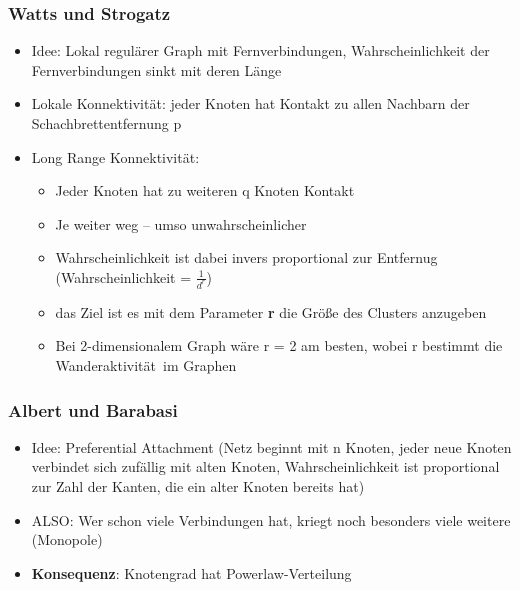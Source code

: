 \documentclass{article} %
\begin{document}
	\subsubsection{Watts und Strogatz}
	\begin{itemize}
		\item Idee: Lokal regulärer Graph mit Fernverbindungen, Wahrscheinlichkeit der Fernverbindungen sinkt mit deren Länge 
		\item Lokale Konnektivität: jeder Knoten hat Kontakt zu allen Nachbarn der Schachbrettentfernung p
		\item Long Range Konnektivität: 
		\begin{itemize}
			\item Jeder Knoten hat zu weiteren q Knoten Kontakt
			\item Je weiter weg – umso unwahrscheinlicher
			\item Wahrscheinlichkeit ist dabei invers proportional zur Entfernug (Wahrscheinlichkeit = $\frac{1}{d^{r}}$)
			\item das Ziel ist es mit dem Parameter \textbf{r} die Größe des Clusters anzugeben
			\item Bei 2-dimensionalem Graph wäre r = 2 am besten, wobei r bestimmt die \glqq Wanderaktivität\grqq\ im Graphen
		\end{itemize}						 
	\end{itemize}
	
	\subsubsection{Albert und Barabasi}
	\begin{itemize}
		\item Idee: Preferential Attachment (Netz beginnt mit n Knoten, jeder neue Knoten verbindet sich zufällig mit alten Knoten, Wahrscheinlichkeit ist proportional zur Zahl der Kanten, die ein alter Knoten bereits hat)
		\item ALSO: Wer schon viele Verbindungen hat, kriegt noch besonders viele weitere (Monopole)
		\item \textbf{Konsequenz}: Knotengrad hat Powerlaw-Verteilung
	\end{itemize}
	
	
\end{document}
